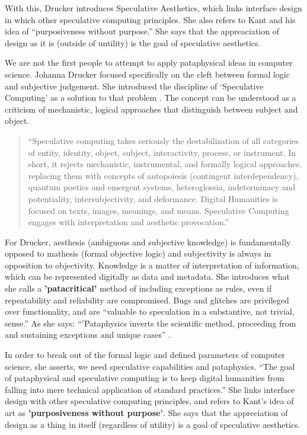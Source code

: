 With this, Drucker introduces Speculative Aesthetics, which links interface design in which other speculative computing principles. She also refers to Kant and his idea of ``purposiveness without purpose.'' She says that the appreaciation of design as it is (outside of untility) is the goal of speculative aesthetics.

We are not the first people to attempt to apply pataphysical ideas in computer science. Johanna Drucker focused specifically on the cleft between formal logic and subjective judgement. She introduced the discipline of `Speculative Computing' as a solution to that problem \autocite{Drucker2007}. The concept can be understood as a criticism of mechanistic, logical approaches that distinguish between subject and object.

\begin{quotation}
  ``Speculative computing takes seriously the destabilization of all categories of entity, identity, object, subject, interactivity, process, or instrument. In short, it rejects mechanistic, instrumental, and formally logical approaches, replacing them with concepts of autopoiesis (contingent interdependency), quantum poetics and emergent systems, heteroglossia, indeterminacy and potentiality, intersubjectivity, and deformance. Digital Humanities is focused on texts, images, meanings, and means. Speculative Computing engages with interpretation and aesthetic provocation.'' 
\end{quotation}

For Drucker, aesthesis (ambiguous and subjective knowledge) is fundamentally opposed to mathesis (formal objective logic) and subjectivity is always in opposition to objectivity. Knowledge is a matter of interpretation of information, which can be represented digitally as data and metadata. She introduces what she calls a \textbf{'patacritical'} method of including exceptions as rules, even if repeatability and reliability are compromised. Bugs and glitches are privileged over functionality, and are ``valuable to speculation in a substantive, not trivial, sense.'' As she says: ``$'$Pataphysics inverts the scientific method, proceeding from and sustaining exceptions and unique cases'' \autocite{Drucker2007}.

In order to break out of the formal logic and defined parameters of computer science, she asserts, we need speculative capabilities and pataphysics. ``The goal of pataphysical and speculative computing is to keep digital humanities from falling into mere technical application of standard practices.'' She links interface design with other speculative computing principles, and refers to Kant's idea of art as \textbf{'purposiveness without purpose'}. She says that the appreciation of design as a thing in itself (regardless of utility) is a goal of speculative aesthetics.

